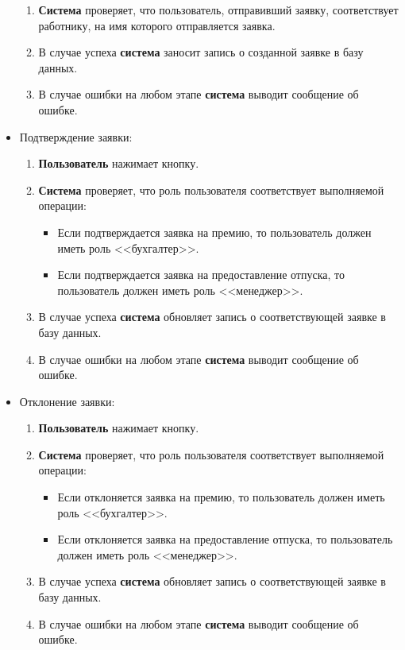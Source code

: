 \begin{itemize}
\begin{enumerate}
        \item \textbf{Система} проверяет, что пользователь, отправивший заявку, соответствует работнику, на имя которого отправляется
            заявка.
        \item В случае успеха \textbf{система} заносит запись о созданной заявке в базу данных.
        \item В случае ошибки на любом этапе \textbf{система} выводит сообщение об ошибке. 
    \end{enumerate}
    \item Подтверждение заявки:
    \begin{enumerate}
        \item \textbf{Пользователь} нажимает кнопку.
        \item \textbf{Система} проверяет, что роль пользователя соответствует выполняемой операции:
        \begin{itemize}
            \item Если подтверждается заявка на премию, то пользователь должен иметь роль <<бухгалтер>>.
            \item Если подтверждается заявка на предоставление отпуска, то пользователь должен иметь роль <<менеджер>>.
        \end{itemize}
        \item В случае успеха \textbf{система} обновляет запись о соответствующей заявке в базу данных.
        \item В случае ошибки на любом этапе \textbf{система} выводит сообщение об ошибке. 
    \end{enumerate}
    \item Отклонение заявки:
    \begin{enumerate}
        \item \textbf{Пользователь} нажимает кнопку.
        \item \textbf{Система} проверяет, что роль пользователя соответствует выполняемой операции:
        \begin{itemize}
            \item Если отклоняется заявка на премию, то пользователь должен иметь роль <<бухгалтер>>.
            \item Если отклоняется заявка на предоставление отпуска, то пользователь должен иметь роль <<менеджер>>.
        \end{itemize}
        \item В случае успеха \textbf{система} обновляет запись о соответствующей заявке в базу данных.
        \item В случае ошибки на любом этапе \textbf{система} выводит сообщение об ошибке. 
    \end{enumerate}
\end{itemize}

